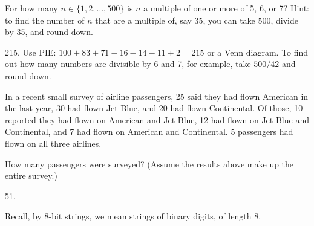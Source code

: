 \begin{questions}
\begin{answer}
	\end{answer}




\question For how many $n \in \{1,2, \ldots, 500\}$ is $n$ a multiple of one or more of 5, 6, or 7?  Hint: to find the number of $n$ that are a multiple of, say $35$, you can take $500$, divide by 35, and round down.

	\begin{answer}
		215.  Use PIE: $100 + 83 + 71 - 16 - 14 -11 + 2 = 215$ or a Venn diagram.  To find out how many numbers are divisible by 6 and 7, for example, take $500/42$ and round down.
	\end{answer}




\question In a recent small survey of airline passengers, 25 said they had flown American in the last year, 30 had flown Jet Blue, and 20 had flown Continental.  Of those, 10 reported they had flown on American and Jet Blue, 12 had flown on Jet Blue and Continental, and 7 had flown on American and Continental.  5 passengers had flown on all three airlines.

How many passengers were surveyed?  (Assume the results above make up the entire survey.)

	\begin{answer}
		51.
	\end{answer}






\question Recall, by $8$-bit strings, we mean strings of binary digits, of length 8.
\end{questions}
